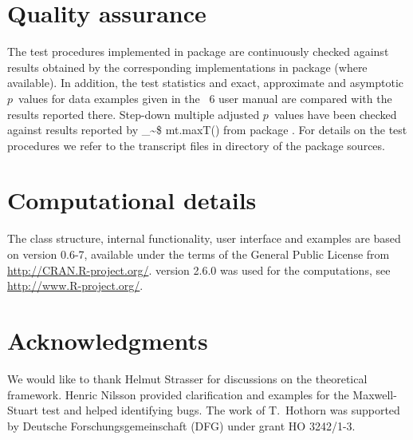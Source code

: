 \documentclass{Z}
\makeatletter
\newcommand\Rcmd{\bgroup\@makeother\_\@makeother\~\@makeother\$\@codez}
\def\@codez#1{{\normalfont\ttfamily\hyphenchar\font=-1 #1()}\egroup}
\makeatother
\begin{document}
\section{Quality assurance}

The test procedures implemented in package  are continuously
checked against results obtained by the corresponding implementations in
package  (where available). In addition, the test statistics
and exact, approximate and asymptotic $p$~values for data examples
given in the ~6 user manual \citep{StatXact6} are compared
with the results reported there. Step-down multiple adjusted $p$~values
have been checked against results reported by \Rcmd{mt.maxT} from
package  \citep{PKG:multtest}. For details on the test
procedures we refer to the  transcript files in directory
 of the  package sources.

\section{Computational details}

The class structure, internal functionality, user interface and examples are
based on  version 0.6-7, available
under the terms of the General Public License from \url{http://CRAN.R-project.org/}. 
 version 2.6.0 was used for 
the computations, see \url{http://www.R-project.org/}.

\section*{Acknowledgments}
 
We would like to thank Helmut Strasser for discussions on the theoretical framework.
Henric Nilsson provided clarification and examples for the Maxwell-Stuart test and helped
identifying bugs. The work of T.~Hothorn was supported by Deutsche Forschungsgemeinschaft (DFG) 
under grant HO 3242/1-3.


\end{document}
